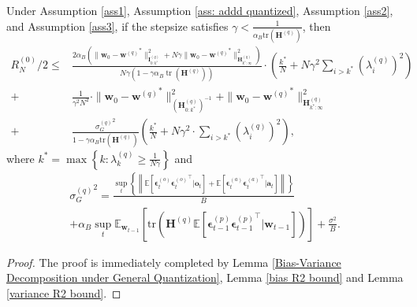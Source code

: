 \documentclass[11pt, letterpaper]{article}
\begin{document}
\begin{lemma}
\label{R_2 bound}
    Under Assumption \ref{ass1}, Assumption \ref{ass: addd quantized}, Assumption \ref{ass2}, and Assumption \ref{ass3}, if the stepsize satisfies $\gamma < \frac{1}{\alpha_B\mathrm{tr}(\mathbf{H}^{(q)})}$, then
    \begin{equation*}
        \begin{aligned}
            R_N^{(0)}/2 \leq &\frac{2\alpha_B\left(\|\mathbf{w}_0-{\mathbf{w}^{(q)}}^*\|_{\mathbf{I}_{0:k^*}^{(q)}}^2+N\gamma\|\mathbf{w}_0-{\mathbf{w}^{(q)}}^*\|_{\mathbf{H}_{k^*:\infty}^{(q)}}^2\right)}{N\gamma(1-\gamma\alpha_B\operatorname{tr}(\mathbf{H}^{(q)}))}\cdot\left(\frac{k^*}{N}+N\gamma^2\sum_{i>k^*}(\lambda_i^{(q)})^2\right)\\
            +& \frac{1}{\gamma^2N^2}\cdot\|\mathbf{w}_0-{\mathbf{w}^{(q)}}^*\|_{(\mathbf{H}_{0:k^*}^{(q)})^{-1}}^2+\|\mathbf{w}_0-{\mathbf{w}^{(q)}}^*\|_{\mathbf{H}_{k^*:\infty}^{(q)}}^2\\
            +& \frac{{\sigma_G^{(q)}}^2}{1-\gamma\alpha_B\mathrm{tr}(\mathbf{H}^{(q)})}\left(\frac{k^*}{N}+N\gamma^2\cdot\sum_{i>k^*}(\lambda_i^{(q)})^2\right),
        \end{aligned}
    \end{equation*}
    where $k^*=\max\left\{k: \lambda_k^{(q)} \geq \frac{1}{N\gamma}\right\}$ and
    \begin{gather*}
        {\sigma_G^{(q)}}^2=\frac{\sup_t \left\{\left\|\mathbb{E}\left[\boldsymbol{\epsilon}_t^{(o)}{\boldsymbol{\epsilon}_t^{(o)}}^\top|\mathbf{o}_t\right]+\mathbb{E}\left[\boldsymbol{\epsilon}_t^{(a)}{\boldsymbol{\epsilon}_t^{(a)}}^\top|\mathbf{a}_t\right] \right\|\right\}}{B}\\
        +\alpha_B\sup_t\mathbb{E}_{\mathbf{w}_{t-1}}\left[\mathrm{tr}\left(\mathbf{H}^{(q)} \mathbb{E}\left[\boldsymbol{\epsilon}_{t-1}^{(p)}{\boldsymbol{\epsilon}_{t-1}^{(p)}}^\top \big| \mathbf{w}_{t-1}\right]\right)\right]
        +\frac{\sigma^2}{B}.
    \end{gather*}
\end{lemma}

\begin{proof}
    The proof is immediately completed by Lemma \ref{Bias-Variance Decomposition under General Quantization}, Lemma \ref{bias R2 bound} and Lemma \ref{variance R2 bound}.
\end{proof}
\end{document}
